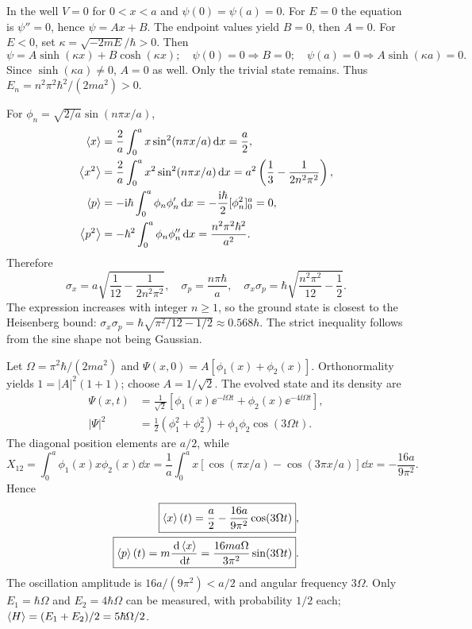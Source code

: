 In the well $V=0$ for $0<x<a$ and $\psi(0)=\psi(a)=0$.
For $E=0$ the equation is $\psi''=0$, hence
$\psi=Ax+B$. The endpoint values yield $B=0$, then $A=0$.
For $E<0$, set $\kappa=\sqrt{-2mE}/\hbar>0$. Then
\begin{equation}
\psi=A\sinh(\kappa x)+B\cosh(\kappa x);
\quad \psi(0)=0\Rightarrow B=0;\quad
\psi(a)=0\Rightarrow A\sinh(\kappa a)=0.
\end{equation}
Since $\sinh(\kappa a)\ne0$, $A=0$ as well. Only the trivial state
remains. Thus $E_n=n^2\pi^2\hbar^2/(2ma^2)>0$.

For $\phi_n=\sqrt{2/a}\sin(n\pi x/a)$,
\begin{align}
\left\langle x\right\rangle&=\frac2a\int_0^a x\sin^2(n\pi x/a)\,\mathrm d x=\frac a2,\\
\left\langle x^2\right\rangle&=\frac2a\int_0^a x^2\sin^2(n\pi x/a)\,\mathrm d x
=a^2\left(\frac13-\frac{1}{2n^2\pi^2}\right),\\
\left\langle p\right\rangle&=-\mathrm i\hbar\int_0^a\phi_n\phi_n'\,\mathrm d x
=-\frac{\mathrm i\hbar}{2}[\phi_n^2]_0^a=0,\\
\left\langle p^2\right\rangle&=-\hbar^2\int_0^a\phi_n\phi_n''\,\mathrm d x
=\frac{n^2\pi^2\hbar^2}{a^2}.
\end{align}
Therefore
\begin{equation}
\boxed{\sigma_x=a\sqrt{\frac1{12}-\frac1{2n^2\pi^2}},
\quad \sigma_p=\frac{n\pi\hbar}{a},\quad
\sigma_x\sigma_p=\hbar\sqrt{\frac{n^2\pi^2}{12}-\frac12}.}
\end{equation}
The expression increases with integer $n\ge1$, so the
ground state is closest to the Heisenberg bound:
$\sigma_x\sigma_p=\hbar\sqrt{\pi^2/12-1/2}\approx0.568\hbar$.
The strict inequality follows from the sine shape not being Gaussian.

Let $\Omega=\pi^2\hbar/(2ma^2)$ and
$\Psi(x,0)=A[\phi_1(x)+\phi_2(x)]$.
Orthonormality yields $1=|A|^2(1+1)$; choose $A=1/\sqrt2$.
The evolved state and its density are
\begin{align}
\Psi(x,t)&=\frac1{\sqrt2}
\left[\phi_1(x)\ee^{-\ii\Omega t}+
\phi_2(x)\ee^{-4\ii\Omega t}\right],\\
|\Psi|^2&=\frac12(\phi_1^2+\phi_2^2)
+\phi_1\phi_2\cos(3\Omega t).
\end{align}
The diagonal position elements are $a/2$, while
\begin{equation}
X_{12}=\int_0^a\phi_1(x)x\phi_2(x)\dd x
=\frac1a\int_0^a x[\cos(\pi x/a)-\cos(3\pi x/a)]\dd x
=-\frac{16a}{9\pi^2}.
\end{equation}
Hence
\begin{align}
\boxed{\left\langle x\right\rangle(t)=\frac a2-\frac{16a}{9\pi^2}\cos(3\Omega t)},\\
\boxed{\left\langle p\right\rangle(t)=m\frac{\,\mathrm d\left\langle x\right\rangle}{\,\mathrm d t}
=\frac{16ma\Omega}{3\pi^2}\sin(3\Omega t)}.
\end{align}
The oscillation amplitude is $16a/(9\pi^2)<a/2$ and angular
frequency $3\Omega$. Only $E_1=\hbar\Omega$ and
$E_2=4\hbar\Omega$ can be measured, with probability $1/2$
each; $\left\langle H\right\rangle=(E_1+E_2)/2=5\hbar\Omega/2$.

